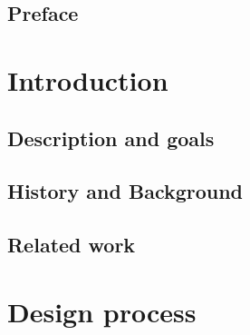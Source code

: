 \documentclass[BSP,english,oneside]{classes/gucthesis}
\begin{document}


\makefrontpages



\clearpage
\setcounter{page}{1}



\chapter*{Preface}
	\label{chap:preface}
	


\tableofcontents
\listoffigures
\listoftables


\newpage
\setcounter{page}{1}
\part{Introduction}
	
		\setcounter{page}{2}	%
		\label{chap:introduction}
		

	\chapter{Description and goals}
		\label{chap:description_goals}
		

	\chapter{History and Background}
		\label{chap:history_and_background}
		

	\chapter{Related work}
		\label{chap:related_work}
		


\part{Design process}
\end{document}
